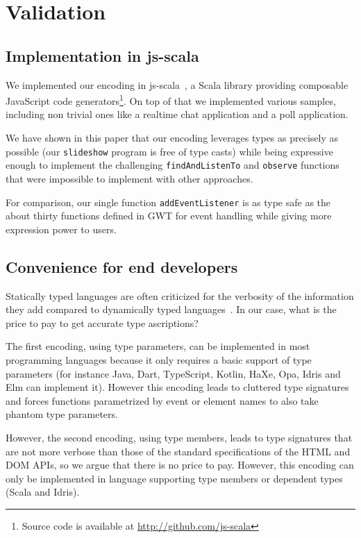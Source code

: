 \documentclass{llncs}
\newcommand{\jscode}[1]{\lstinline[language=JavaScript]|#1|}
\newcommand{\scalacode}[1]{\lstinline[language=Scala]|#1|}
\begin{document}
\section{Validation}
\label{sec-validation}

\subsection{Implementation in js-scala}

We implemented our encoding in js-scala~\cite{Kossakowski12_JsDESL}, a Scala library providing composable JavaScript code generators\footnote{Source code is available at \href{http://github.com/js-scala}{http://github.com/js-scala}}. On top of that we implemented various samples, including non trivial ones like a realtime chat application and a poll application.

We have shown in this paper that our encoding leverages types as precisely as possible (our \scalacode{slideshow} program is free of type casts) while being expressive enough to implement the challenging \jscode{findAndListenTo} and \jscode{observe} functions that were impossible to implement with other approaches.

For comparison, our single function \scalacode{addEventListener} is as type safe as the about thirty functions defined in GWT for event handling while giving more expression power to users.

\subsection{Convenience for end developers}

Statically typed languages are often criticized for the verbosity of the information they add compared to dynamically typed languages~\cite{meijer2004static}. In our case, what is the price to pay to get accurate type ascriptions?

The first encoding, using type parameters, can be implemented in most programming languages because it only requires a basic support of type parameters (for instance Java, Dart, TypeScript, Kotlin, HaXe, Opa, Idris and Elm can implement it). However this encoding leads to cluttered type signatures and forces functions parametrized by event or element names to also take phantom type parameters.

However, the second encoding, using type members, leads to type signatures that are not more verbose than those of the standard specifications of the HTML and DOM APIs, so we argue that there is no price to pay. However, this encoding can only be implemented in language supporting type members or dependent types (Scala and Idris).
\end{document}
